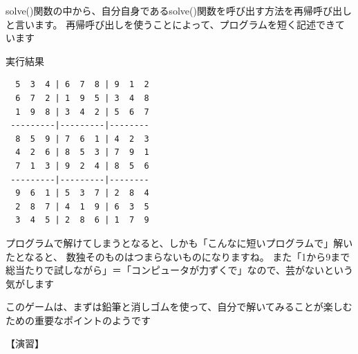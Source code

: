 \documentclass[uplatex,a4paper,11pt,oneside,openany]{jsbook}
\begin{document}
solve()関数の中から、自分自身であるsolve()関数を呼び出す方法を再帰呼び出しと言います。
再帰呼び出しを使うことによって、プログラムを短く記述できています

実行結果

\begin{verbatim}
  5  3  4 | 6  7  8 | 9  1  2
  6  7  2 | 1  9  5 | 3  4  8
  1  9  8 | 3  4  2 | 5  6  7
 ---------|---------|--------
  8  5  9 | 7  6  1 | 4  2  3
  4  2  6 | 8  5  3 | 7  9  1
  7  1  3 | 9  2  4 | 8  5  6
 ---------|---------|--------
  9  6  1 | 5  3  7 | 2  8  4
  2  8  7 | 4  1  9 | 6  3  5
  3  4  5 | 2  8  6 | 1  7  9
\end{verbatim}

プログラムで解けてしまうとなると、しかも「こんなに短いプログラムで」解いたとなると、
数独そのものはつまらないものになりますね。
また「1から9まで総当たりで試しながら」＝「コンピュータが力ずくで」なので、芸がないという気がします

このゲームは、まずは鉛筆と消しゴムを使って、自分で解いてみることが楽しむための重要なポイントのようです

【演習】
\end{document}
